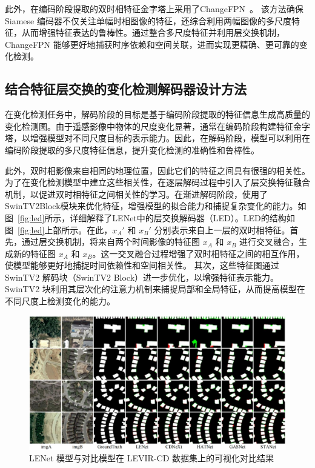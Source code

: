 此外，在编码阶段提取的双时相特征金字塔上采用了ChangeFPN~\cite{dong_efficientcd_2024}。 该方法确保 Siamese 编码器不仅关注单幅时相图像的特征，还综合利用两幅图像的多尺度特征，从而增强特征表达的鲁棒性。通过整合多尺度特征并利用层交换机制，ChangeFPN 能够更好地捕获时序依赖和空间关联，进而实现更精确、更可靠的变化检测。

\subsection{结合特征层交换的变化检测解码器设计方法}
在变化检测任务中，解码阶段的目标是基于编码阶段提取的特征信息生成高质量的变化检测图。由于遥感影像中物体的尺度变化显著，通常在编码阶段构建特征金字塔，以增强模型对不同尺度目标的表示能力。因此，在解码阶段，模型可以利用在编码阶段提取的多尺度特征信息，提升变化检测的准确性和鲁棒性。

此外，双时相影像来自相同的地理位置，因此它们的特征之间具有很强的相关性。为了在变化检测模型中建立这些相关性，在逐层解码过程中引入了层交换特征融合机制，以促进双时相特征之间相关性的学习。在渐进解码阶段，使用了SwinTV2Block模块来优化特征，增强模型的拟合能力和捕捉复杂变化的能力。如图~\ref{fig:led}所示，详细解释了LENet中的层交换解码器（LED）。LED的结构如图~\ref{fig:led}上部所示。在此，$x_A'$ 和 $x_B'$ 分别表示来自上一层的双时相特征。首先，通过层交换机制，将来自两个时间影像的特征图 $x_A$ 和 $x_B$ 进行交叉融合，生成新的特征图 $x_A$ 和 $x_B$。这一交叉融合过程增强了双时相特征之间的相互作用，使模型能够更好地捕捉时间依赖性和空间相关性。 其次，这些特征图通过 SwinTV2 解码块（SwinTV2 Block）进一步优化，以增强特征表示能力。SwinTV2 块利用其层次化的注意力机制来捕捉局部和全局特征，从而提高模型在不同尺度上检测变化的能力。  

\begin{figure}[!htbp]
  \centering
  \includegraphics[width=\textwidth]{paper_figures/基于双时相遥感影像特征交互的变化检测算法研究/LENet/lenet_levir.png}
  \caption{LENet 模型与对比模型在 LEVIR-CD 数据集上的可视化对比结果}
  \label{fig:lenet_levir}
\end{figure}


